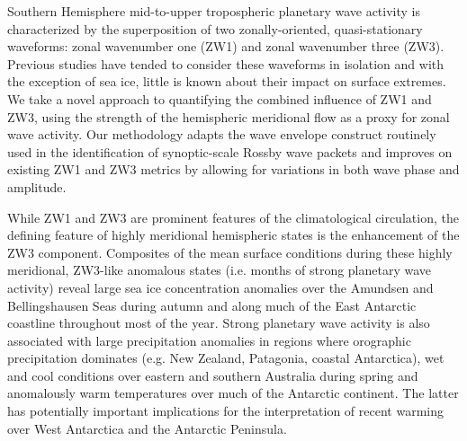 Southern Hemisphere mid-to-upper tropospheric planetary wave activity is characterized by the superposition of two zonally-oriented, quasi-stationary waveforms: zonal wavenumber one (ZW1) and zonal wavenumber three (ZW3). Previous studies have tended to consider these waveforms in isolation and with the exception of sea ice, little is known about their impact on surface extremes. We take a novel approach to quantifying the combined influence of ZW1 and ZW3, using the strength of the hemispheric meridional flow as a proxy for zonal wave activity. Our methodology adapts the wave envelope construct routinely used in the identification of synoptic-scale Rossby wave packets and improves on existing ZW1 and ZW3 metrics by allowing for variations in both wave phase and amplitude.

While ZW1 and ZW3 are prominent features of the climatological circulation, the defining feature of highly meridional hemispheric states is the enhancement of the ZW3 component. Composites of the mean surface conditions during these highly meridional, ZW3-like anomalous states (i.e. months of strong planetary wave activity) reveal large sea ice concentration anomalies over the Amundsen and Bellingshausen Seas during autumn and along much of the East Antarctic coastline throughout most of the year. Strong planetary wave activity is also associated with large precipitation anomalies in regions where orographic precipitation dominates (e.g. New Zealand, Patagonia, coastal Antarctica), wet and cool conditions over eastern and southern Australia during spring and anomalously warm temperatures over much of the Antarctic continent. The latter has potentially important implications for the interpretation of recent warming over West Antarctica and the Antarctic Peninsula.
